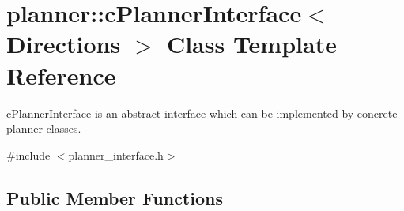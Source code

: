 \hypertarget{classplanner_1_1c_planner_interface}{}\section{planner\+:\+:c\+Planner\+Interface$<$ Directions $>$ Class Template Reference}
\label{classplanner_1_1c_planner_interface}


\mbox{\hyperlink{classplanner_1_1c_planner_interface}{c\+Planner\+Interface}} is an abstract interface which can be implemented by concrete planner classes.  




{\ttfamily \#include $<$planner\+\_\+interface.\+h$>$}

\subsection*{Public Member Functions}
